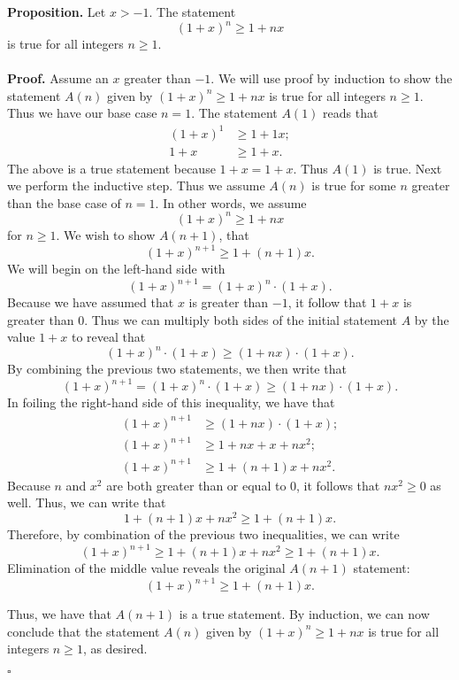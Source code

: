 \documentclass[12pt]{exam}
\begin{document}
\begin{questions}
\question
\textbf{Proposition.} Let $x > -1$. The statement $$(1+x)^n \geq 1+nx$$ is true for all integers $n \geq 1.$ 
\\
\\\textbf{Proof.} Assume an $x$ greater than $-1$. We will use proof by induction to show the statement $A(n)$ given by $(1+x)^n \geq 1+nx$ is true for all integers $n \geq 1$. Thus we have our base case $n=1$. The statement $A(1)$ reads that
\begin{align*}
(1+x)^1 &\geq 1+1x;\\
1+x &\geq 1+x. 
\end{align*}
The above is a true statement because $1+x = 1+x$. Thus $A(1)$ is true. Next we perform the inductive step. Thus we assume $A(n)$ is true for some $n$ greater than the base case of $n=1$. In other words, we assume  $$(1+x)^n \geq 1+nx $$ for $n \geq 1$. We wish to show $A(n+1)$, that $$(1+x)^{n+1} \geq 1+(n+1)x.$$ We will begin on the left-hand side with $$(1+x)^{n+1} = (1+x)^n \cdot (1+x).$$ Because we have assumed that $x$ is greater than $-1$, it follow that $1+x$ is greater than $0$. Thus we can multiply both sides of the initial statement $A$ by the value $1+x$ to reveal that $$(1+x)^n \cdot (1+x) \geq (1+nx) \cdot (1+x).$$ By combining the previous two statements, we then write that $$(1+x)^{n+1} = (1+x)^n \cdot (1+x) \geq (1+nx) \cdot (1+x).$$ In foiling the right-hand side of this inequality, we have that 
\begin{align*}
(1+x)^{n+1} &\geq (1+nx) \cdot (1+x) ;\\
(1+x)^{n+1} &\geq 1 + nx + x + nx^2 ;\\
(1+x)^{n+1} &\geq 1 + (n+1)x + nx^2 .
\end{align*}
Because $n$ and $x^2$ are both greater than or equal to $0$, it follows that $nx^2 \geq 0$ as well. Thus, we can write that $$1 + (n+1)x + nx^2 \geq 1 + (n+1)x.$$ Therefore, by combination of the previous two inequalities, we can write $$(1+x)^{n+1} \geq 1 + (n+1)x + nx^2 \geq 1 + (n+1)x.$$ Elimination of the middle value reveals the original $A(n+1)$ statement:  $$(1+x)^{n+1} \geq 1 + (n+1)x.$$

Thus, we have that $A(n+1)$ is a true statement. By induction, we can now conclude that the statement $A(n)$ given by $(1+x)^n \geq 1+nx$ is true for all integers $n \geq 1$, as desired.
\begin{flushright}
$\square$
\end{flushright}

\end{questions}
\end{document}
